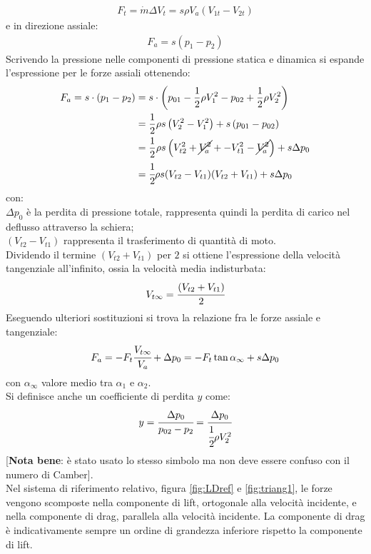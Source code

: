 \begin{align*}
F_t= \dot{m} \Delta V_t = s \rho	V_a (V_{1t}-V_{2t})
\end{align*}
e in direzione assiale:
\begin{align*}
F_a = s (p_1 - p_2)
\end{align*}
Scrivendo la pressione nelle componenti di pressione statica e dinamica si espande l'espressione per le forze assiali ottenendo:
\begin{align*}
F_a = s \cdot ( p_1 - p_2) &= s \cdot \left( p_{01} - \frac{1}{2} \rho V_1^2 - p_{02} + \frac{1}{2} \rho V_2^2 \right)\\
&= \frac{1}{2} \rho s \left( V_2^2 - V_1^2 \right) + s \left( p_{01} - p_{02} \right)\\
&= \frac{1}{2} \rho s \left( V_{t2}^2 + \cancel{V_a^2} + - V_{t1}^2- \cancel{V_a^2} \right) + s \Delta p_0\\
&=\cfrac{1}{2} \rho s (V_{t2}-V_{t1}) (V_{t2}+V_{t1}) + s \Delta p_0
\end{align*}
con:\\[1mm]
$\Delta p_0$ è la perdita di pressione totale, rappresenta quindi la perdita di carico nel deflusso attraverso la schiera; \\
$(V_{t2}-V_{t1})$ rappresenta il trasferimento di quantità di moto. \\[2mm]
Dividendo il termine $(V_{t2}+V_{t1})$ per $2$ si ottiene l'espressione della velocità tangenziale all'infinito, ossia la velocità media indisturbata:
\begin{align*}
V_{t \infty}=\cfrac{(V_{t2}+V_{t1})}{2}
\end{align*}
Eseguendo ulteriori sostituzioni si trova la relazione fra le forze assiale e tangenziale:
\begin{align*}
F_a = -F_t \cfrac{V_{t \infty}}{V_a} + \Delta p_0 = - F_t \tan \alpha_{\infty} + s \Delta p_0
\end{align*}
con $\alpha_{\infty}$ valore medio tra $\alpha_1$ e $\alpha_2$.\\
Si definisce anche un coefficiente di perdita $y$ come:
\begin{align*}
y = \cfrac{\Delta p_0}{p_{02}-p_2} = \cfrac{\Delta p_0}{\cfrac{1}{2} \rho V_2^2}
\end{align*}
[\textbf{Nota bene}: è stato usato lo stesso simbolo ma non deve essere confuso con il numero di Camber].\\
Nel sistema di riferimento relativo, figura \ref{fig:LDref} e \ref{fig:triang1}, le forze vengono scomposte nella componente di lift, ortogonale alla velocità incidente, e nella componente di drag, parallela alla velocità incidente. La componente di drag è indicativamente sempre un ordine di grandezza inferiore rispetto la componente di lift.
